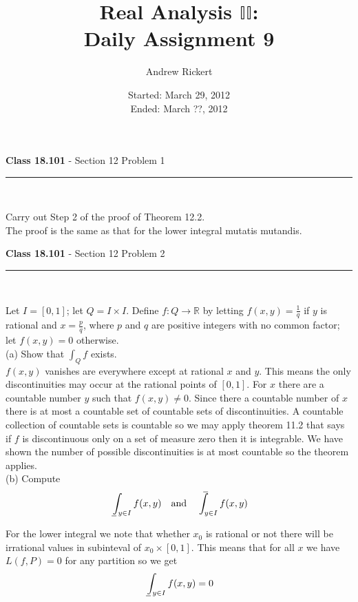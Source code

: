 \documentclass[11pt,reqno]{article}
\title{Real Analysis $\mathbb{II}$: \\ Daily Assignment 9}
\author{Andrew Rickert}
\date{Started: March 29, 2012 \\ \hspace{1pt} Ended: March ??,  2012}                                           %
\def\uint{\mathchoice%
    {\mkern13mu\overline{\vphantom{\intop}\mkern9mu}\mkern-20mu}%
    {\mkern9mu\overline{\vphantom{\intop}\mkern9mu}\mkern-14mu}%
    {\mkern9mu\overline{\vphantom{\intop}\mkern9mu}\mkern-14mu}%
    {\mkern9mu\overline{\vphantom{\intop}\mkern9mu}\mkern-14mu}%
  \int}
\def\lint{\mkern3mu\underline{\vphantom{\intop}\mkern9mu}\mkern-10mu\int}
\begin{document}
\maketitle


\begin{flushleft} 
\textbf{Class 18.101} - Section 12 Problem 1\\
\rule{500pt}{1pt}\\
\end{flushleft} 

\noindent Carry out Step 2 of the proof of Theorem 12.2.\\

The proof is the same as that for the lower integral mutatis mutandis.

\begin{flushleft} 
\textbf{Class 18.101} - Section 12 Problem 2\\
\rule{500pt}{1pt}\\
\end{flushleft} 

Let $I = [0,1]$; let $Q = I \times I$. Define $f : Q \to \mathbb{R}$ by letting $f(x,y) = \frac{1}{q}$ if $y$ is rational and $x = \frac{p}{q}$, where $p$ and $q$ are positive integers with no common factor; let $f(x,y) = 0$ otherwise.\\

\noindent (a) Show that $\int_Q f$ exists.\\

$f(x,y)$ vanishes are everywhere except at rational $x$ and $y$. This means the only discontinuities may occur at the rational points of $[0,1]$. For $x$ there are a countable number $y$ such that $f(x,y) \neq 0$. Since there a countable number of $x$ there is at most a countable set of countable sets of discontinuities. A countable collection of countable sets is countable so we may apply theorem 11.2 that says if $f$ is discontinuous only on a set of measure zero then it is integrable. We have shown the number of possible discontinuities is at most countable so the theorem applies.\\

\noindent (b) Compute
\[ \lint_{y \in I} f(x,y) \quad \text{and} \quad \uint_{y \in I} f(x,y)\]

For the lower integral we note that whether $x_0$ is rational or not there will be irrational values in subinteval of $x_0 \times [0,1]$. This means that for all $x$ we have $L(f,P) = 0$ for any partition so we get 
\[ \lint_{y \in I} f(x,y)  = 0 \]
\end{document}
